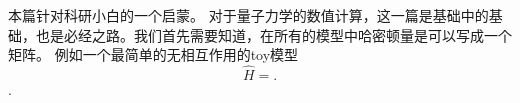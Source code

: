 本篇针对科研小白的一个启蒙。
对于量子力学的数值计算，这一篇是基础中的基础，也是必经之路。我们首先需要知道，在所有的模型中哈密顿量是可以写成一个矩阵。
例如一个最简单的无相互作用的toy模型
\begin{equation}\label{ham1}
\hat{H}=.
\end{equation}
.
